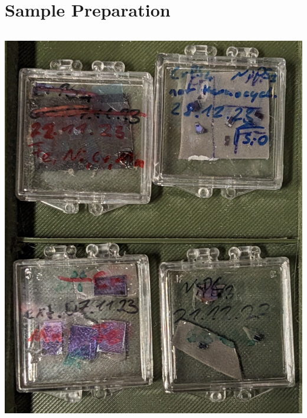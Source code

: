 \documentclass[
	10pt,
]{beamer}
\begin{document}
\section{Sample Preparation}
\begin{frame}
	\begin{columns}
		\tableofcontents[currentsection]

		\centering
		\vfill
		\includegraphics[width=\textwidth]{../figures/samples.jpg}
	\end{columns}
\end{frame}
\end{document}
